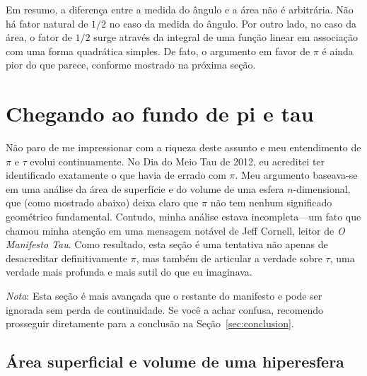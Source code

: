 Em resumo, a diferença entre a medida do ângulo e a área não é arbitrária. \linebreak Não há fator natural de $1/2$ no caso da medida do ângulo. Por outro lado, no caso da área, o fator de $1/2$ surge através da integral de uma função linear em associação com uma forma quadrática simples. De fato, o argumento em favor de $\pi$ é ainda pior do que parece, conforme mostrado na próxima seção.


\section{Chegando ao fundo de pi e tau} %
\label{sec:getting_to_the_bottom_of_pi}

Não paro de me impressionar com a riqueza deste assunto e meu entendimento de $\pi$ e $\tau$ evolui continuamente. No Dia do Meio Tau de 2012, eu acreditei ter identificado exatamente o que havia de errado com $\pi$. Meu argumento baseava-se em uma análise da área de superfície e do volume de uma esfera $n$-dimensional, que (como mostrado abaixo) deixa claro que $\pi$ não tem nenhum significado geométrico fundamental. Contudo, minha análise estava incompleta---um fato que chamou minha atenção em uma mensagem notável de Jeff Cornell, leitor de \emph{O Manifesto Tau}. Como resultado, esta seção é uma tentativa não apenas de desacreditar definitivamente $\pi$, mas também de articular a verdade sobre $\tau$, uma verdade mais profunda e mais sutil do que eu imaginava.

\emph{Nota}: Esta seção é mais avançada que o restante do manifesto e pode ser ignorada sem perda de continuidade. Se você a achar confusa, recomendo prosseguir diretamente para a conclusão na Seção~\ref{sec:conclusion}.

  \subsection{Área superficial e volume de uma hiperesfera} %
  \label{sec:volume_of_a_hypersphere}

